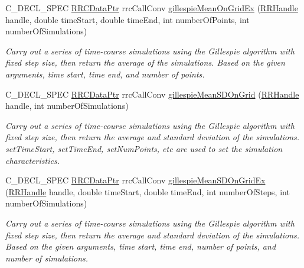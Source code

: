 \begin{DoxyCompactItemize}
C\+\_\+\+D\+E\+C\+L\+\_\+\+S\+P\+E\+C \hyperlink{rrc__types_8h_a9da8b124eb9c3c0045f8926c6a420b4a}{R\+R\+C\+Data\+Ptr} rrc\+Call\+Conv \hyperlink{group__stochastic_ga984a669536f489f257335903ce54469c}{gillespie\+Mean\+On\+Grid\+Ex} (\hyperlink{rrc__types_8h_a1d68f0592372208fa5a5f2799ea4b3ae}{R\+R\+Handle} handle, double time\+Start, double time\+End, int number\+Of\+Points, int number\+Of\+Simulations)
\begin{DoxyCompactList}\small\item\em Carry out a series of time-\/course simulations using the Gillespie algorithm with fixed step size, then return the average of the simulations. Based on the given arguments, time start, time end, and number of points. \end{DoxyCompactList}\item 
C\+\_\+\+D\+E\+C\+L\+\_\+\+S\+P\+E\+C \hyperlink{rrc__types_8h_a9da8b124eb9c3c0045f8926c6a420b4a}{R\+R\+C\+Data\+Ptr} rrc\+Call\+Conv \hyperlink{group__stochastic_ga4caaa9e174e6b9065524e7cdc56fabb4}{gillespie\+Mean\+S\+D\+On\+Grid} (\hyperlink{rrc__types_8h_a1d68f0592372208fa5a5f2799ea4b3ae}{R\+R\+Handle} handle, int number\+Of\+Simulations)
\begin{DoxyCompactList}\small\item\em Carry out a series of time-\/course simulations using the Gillespie algorithm with fixed step size, then return the average and standard deviation of the simulations. set\+Time\+Start, set\+Time\+End, set\+Num\+Points, etc are used to set the simulation characteristics. \end{DoxyCompactList}\item 
C\+\_\+\+D\+E\+C\+L\+\_\+\+S\+P\+E\+C \hyperlink{rrc__types_8h_a9da8b124eb9c3c0045f8926c6a420b4a}{R\+R\+C\+Data\+Ptr} rrc\+Call\+Conv \hyperlink{group__stochastic_ga11f181f858ccff7015069b6479772024}{gillespie\+Mean\+S\+D\+On\+Grid\+Ex} (\hyperlink{rrc__types_8h_a1d68f0592372208fa5a5f2799ea4b3ae}{R\+R\+Handle} handle, double time\+Start, double time\+End, int number\+Of\+Steps, int number\+Of\+Simulations)
\begin{DoxyCompactList}\small\item\em Carry out a series of time-\/course simulations using the Gillespie algorithm with fixed step size, then return the average and standard deviation of the simulations. Based on the given arguments, time start, time end, number of points, and number of simulations. \end{DoxyCompactList}\end{DoxyCompactItemize}


